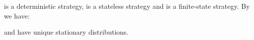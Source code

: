 \FB is a deterministic strategy, \RB is a stateless strategy and \GG is a
finite-state strategy. By  we have:

\begin{lemma} \label{lem:fb-gg-rb-ergodic}
  \FB and \RB have unique stationary distributions.
\end{lemma}


